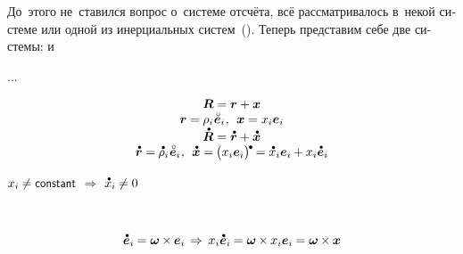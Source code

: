 \begin{otherlanguage}{russian}

До~этого не~ставился вопрос о~системе отсчёта, всё рассматривалось в~некой  системе или одной из инерциальных систем~(). Теперь представим себе две системы:  и~

...

\begin{equation*}
\begin{array}{c}
\bm{R} = \bm{r} + \bm{x}
\\
\bm{r} = \hspace{-0.1ex} \rho_i \hspace{.1ex} \mathcircabove{\bm{e}}_i
\hspace{.1ex} , \:\:
\bm{x} = x_i \bm{e}_i
\\
\mathdotabove{\bm{R}} = \mathdotabove{\bm{r}} + \mathdotabove{\bm{x}}
\\
\mathdotabove{\bm{r}} = \hspace{-0.1ex}
\mathdotabove{\rho}_i \hspace{.1ex} \mathcircabove{\bm{e}}_i
\hspace{.1ex} , \:\:
\mathdotabove{\bm{x}} = \hspace{-0.15ex} \bigl( x_i \bm{e}_i \bigr)^{\hspace{-0.15ex}\tikz[baseline=-0.2ex]\draw[black, fill=black] (0,0) circle (.28ex);} \hspace{-0.15ex}
= \mathdotabove{x}_i \bm{e}_i \hspace{-0.1ex} + x_i \mathdotabove{\bm{e}}_i
\end{array}
\end{equation*}

${x_i \hspace{-0.1ex} \neq \constant}$ $\Rightarrow$ ${\mathdotabove{x}_i \hspace{-0.1ex} \neq 0}$

~

\nopagebreak\vspace{-0.2em}\begin{equation*}
\mathdotabove{\bm{e}}_i \hspace{-0.1ex} = \bm{\omega} \hspace{-0.1ex} \times \hspace{-0.1ex} \bm{e}_i
\hspace{.33ex} \Rightarrow \hspace{.4ex}
x_i \mathdotabove{\bm{e}}_i \hspace{-0.1ex} = \bm{\omega} \hspace{-0.1ex} \times \hspace{-0.1ex} x_i \bm{e}_i \hspace{-0.1ex}
= \bm{\omega} \hspace{-0.1ex} \times \hspace{-0.1ex} \bm{x}
\end{equation*}


\end{otherlanguage}
